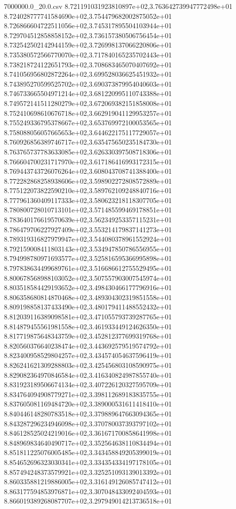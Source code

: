 \begin{filecontents*}{7000000.0_20.0.csv}
8.721191031923810897e+02,3.763642739947772498e+01
8.724028777741584690e+02,3.754479682002875052e+01
8.726866604722511056e+02,3.745317895504103944e+01
8.729704512858858152e+02,3.736157380506756454e+01
8.732542502142944159e+02,3.726998137066220806e+01
8.735380572566770070e+02,3.717840165235702443e+01
8.738218724122651793e+02,3.708683465070407692e+01
8.741056956802872264e+02,3.699528036625451932e+01
8.743895270599525702e+02,3.690373879954040603e+01
8.746733665504971214e+02,3.681220995110743388e+01
8.749572141511280279e+02,3.672069382151858008e+01
8.752410698610676718e+02,3.662919041129953257e+01
8.755249336795378667e+02,3.653769972100053565e+01
8.758088056057665653e+02,3.644622175117729057e+01
8.760926856389746717e+02,3.635475650235184730e+01
8.763765737783633085e+02,3.626330397508718306e+01
8.766604700231717970e+02,3.617186416993172315e+01
8.769443743726076264e+02,3.608043708741388400e+01
8.772282868258938606e+02,3.598902272808572889e+01
8.775122073822590210e+02,3.589762109248840716e+01
8.777961360409117333e+02,3.580623218118307705e+01
8.780800728010713101e+02,3.571485599469178851e+01
8.783640176619570639e+02,3.562349253357115231e+01
8.786479706227927409e+02,3.553214179837141273e+01
8.789319316827979947e+02,3.544080378961552924e+01
8.792159008411803143e+02,3.534947850786556955e+01
8.794998780971693577e+02,3.525816595366995898e+01
8.797838634499689761e+02,3.516686612755529495e+01
8.800678568988103052e+02,3.507557903007545974e+01
8.803518584429193652e+02,3.498430466177796916e+01
8.806358680814870468e+02,3.489304302319851558e+01
8.809198858137433490e+02,3.480179411488552432e+01
8.812039116389098581e+02,3.471055793739287765e+01
8.814879455561981558e+02,3.461933449124626350e+01
8.817719875648343759e+02,3.452812377699319768e+01
8.820560376640238474e+02,3.443692579519574792e+01
8.823400958529804257e+02,3.434574054637596419e+01
8.826241621309288803e+02,3.425456803108590975e+01
8.829082364970846584e+02,3.416340824987855740e+01
8.831923189506674134e+02,3.407226120327595709e+01
8.834764094908779271e+02,3.398112689183835755e+01
8.837605081169484720e+02,3.389000531611418410e+01
8.840446148280783518e+02,3.379889647663094365e+01
8.843287296234946098e+02,3.370780037393797102e+01
8.846128525024219016e+02,3.361671700858641998e+01
8.848969834640490717e+02,3.352564638110834494e+01
8.851811225076005485e+02,3.343458849205399019e+01
8.854652696323030341e+02,3.334354334197178105e+01
8.857494248373579921e+02,3.325251093139013392e+01
8.860335881219886005e+02,3.316149126085747412e+01
8.863177594853976871e+02,3.307048433092404593e+01
8.866019389268087707e+02,3.297949014213736518e+01

\end{filecontents*}
